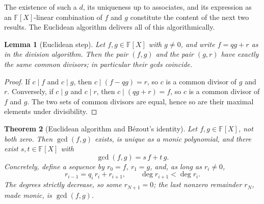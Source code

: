 \documentclass[11pt,a4paper]{article}
\newtheorem{theorem}{Theorem}[section]
\newtheorem{lemma}[theorem]{Lemma}
\theoremstyle{definition}
\theoremstyle{remark}
\newcommand{\F}{\ensuremath{\mathbb{F}}}
\begin{document}
The existence of such a \(d\), its uniqueness up to associates, and its
expression as an \(\F[X]\)-linear combination of \(f\) and \(g\) constitute the
content of the next two results. The Euclidean algorithm delivers all of this
algorithmically.

\begin{lemma}[Euclidean step]\label{polynomials:lem:euclid-step}
Let \(f, g \in \F[X]\) with \(g \neq 0\), and write \(f = q g + r\) as in the
division algorithm. Then the pair \((f, g)\) and the pair \((g, r)\) have exactly
the same common divisors; in particular their gcds coincide.
\end{lemma}

\begin{proof}
If \(c \mid f\) and \(c \mid g\), then \(c \mid (f - q g) = r\), so \(c\) is a
common divisor of \(g\) and \(r\). Conversely, if \(c \mid g\) and \(c \mid r\),
then \(c \mid (q g + r) = f\), so \(c\) is a common divisor of \(f\) and \(g\).
The two sets of common divisors are equal, hence so are their maximal elements
under divisibility.
\end{proof}

\begin{theorem}[Euclidean algorithm and B\'ezout's identity]
\label{polynomials:thm:euclid}
Let \(f, g \in \F[X]\), not both zero. Then \(\gcd(f, g)\) exists, is unique as a
monic polynomial, and there exist \(s, t \in \F[X]\) with
\begin{equation}\label{polynomials:eq:bezout}
  \gcd(f, g) = s\, f + t\, g.
\end{equation}
Concretely, define a sequence by \(r_0 = f\), \(r_1 = g\), and, as long as
\(r_{i} \neq 0\),
\[
  r_{i-1} = q_i\, r_{i} + r_{i+1},
  \qquad \deg r_{i+1} < \deg r_{i}.
\]
The degrees strictly decrease, so some \(r_{N+1} = 0\); the last nonzero
remainder \(r_N\), made monic, is \(\gcd(f, g)\).
\end{theorem}
\end{document}
